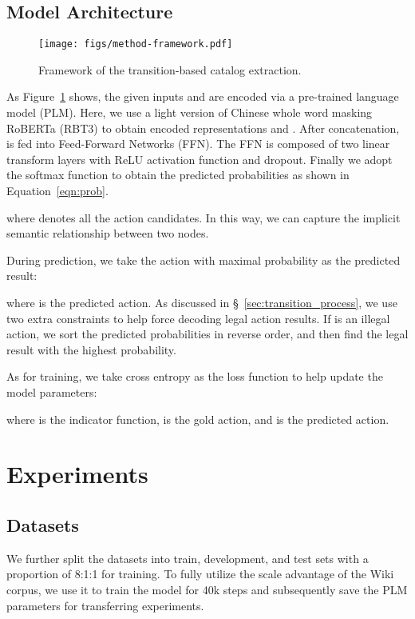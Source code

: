 \documentclass[runningheads]{llncs}
\begin{document}
\subsection{Model Architecture}

\begin{figure}[t]
    \centering
    \texttt{[image: figs/method-framework.pdf]}
    \caption{Framework of the transition-based catalog extraction.}
    \label{fig:tracer_framework}
\end{figure}

As Figure~\ref{fig:tracer_framework} shows, the given inputs  and  are encoded via a pre-trained language model (PLM).
Here, we use a light version of Chinese whole word masking RoBERTa (RBT3) \cite{cui-bert-wwm} to obtain encoded representations  and .
After concatenation,  is fed into Feed-Forward Networks (FFN).
The FFN is composed of two linear transform layers with ReLU activation function and dropout.
Finally we adopt the softmax function to obtain the predicted probabilities as shown in Equation~\ref{eqn:prob}.

where  denotes all the action candidates. In this way, we can capture the implicit semantic relationship between two nodes.

During prediction, we take the action with maximal probability  as the predicted result:

where  is the predicted action.
As discussed in \S~\ref{sec:transition_process}, we use two extra constraints to help force decoding legal action results.
If  is an illegal action, we sort the predicted probabilities in reverse order, and then find the legal result with the highest probability.

As for training, we take cross entropy as the loss function to help update the model parameters:

where  is the indicator function,  is the gold action, and  is the predicted action.
 \section{Experiments}
\subsection{Datasets}
We further split the datasets into train, development, and test sets with a proportion of 8:1:1 for training.
To fully utilize the scale advantage of the Wiki corpus, we use it to train the model for 40k steps and subsequently save the PLM parameters for transferring experiments.
\end{document}
